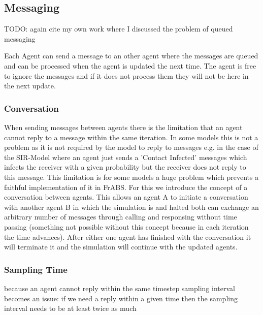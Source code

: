 \subsection{Messaging}
TODO: again cite my own work where I discussed the problem of queued messaging

Each Agent can send a message to an other agent where the messages are queued and can be processed when the agent is updated the next time. The agent is free to ignore the messages and if it does not process them they will not be here in the next update.

\subsubsection{Conversation}
When sending messages between agents there is the limitation that an agent cannot reply to a message within the same iteration. In some models this is not a problem as it is not required by the model to reply to messages e.g. in the case of the SIR-Model where an agent just sends a 'Contact Infected' messages which infects the receiver with a given probability but the receiver does not reply to this message.
This limitation is for some models a huge problem which prevents a faithful implementation of it in FrABS. For this we introduce the concept of a conversation between agents. This allows an agent A to initiate a conversation with another agent B in which the simulation is and halted both can exchange an arbitrary number of messages through calling and responsing without time passing (something not possible without this concept because in each iteration the time advances). After either one agent has finished with the conversation it will terminate it and the simulation will continue with the updated agents.

\subsubsection{Sampling Time}
because an agent cannot reply within the same timestep sampling interval becomes an issue: if we need a reply within a given time then the sampling interval needs to be at least twice as much